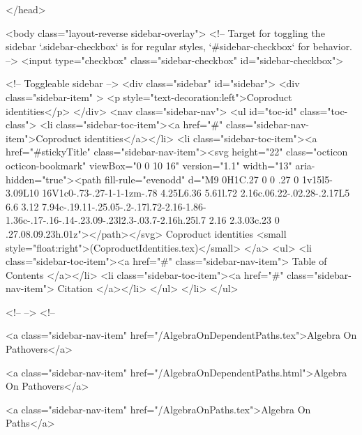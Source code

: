</head>


  <body class="layout-reverse sidebar-overlay">
    <!-- Target for toggling the sidebar `.sidebar-checkbox` is for regular
     styles, `#sidebar-checkbox` for behavior. -->
<input type="checkbox" class="sidebar-checkbox" id="sidebar-checkbox">

<!-- Toggleable sidebar -->
<div class="sidebar" id="sidebar">
  <div class="sidebar-item" >
    <p style="text-decoration:left">Coproduct identities</p>
  </div>
  <nav class="sidebar-nav">
    <ul id="toc-id" class="toc-class">
  <li class="sidebar-toc-item"><a href="#" class="sidebar-nav-item">Coproduct identities</a></li>
  <li class="sidebar-toc-item"><a href="#stickyTitle" class="sidebar-nav-item"><svg height="22" class="octicon octicon-bookmark" viewBox="0 0 10 16" version="1.1" width="13" aria-hidden="true"><path fill-rule="evenodd" d="M9 0H1C.27 0 0 .27 0 1v15l5-3.09L10 16V1c0-.73-.27-1-1-1zm-.78 4.25L6.36 5.61l.72 2.16c.06.22-.02.28-.2.17L5 6.6 3.12 7.94c-.19.11-.25.05-.2-.17l.72-2.16-1.86-1.36c-.17-.16-.14-.23.09-.23l2.3-.03.7-2.16h.25l.7 2.16 2.3.03c.23 0 .27.08.09.23h.01z"></path></svg> Coproduct identities <small style="float:right">(CoproductIdentities.tex)</small>
</a>
    <ul>
      <li class="sidebar-toc-item"><a href="#" class="sidebar-nav-item"> Table of Contents </a></li>
      <li class="sidebar-toc-item"><a href="#" class="sidebar-nav-item"> Citation </a></li>
    </ul>
  </li>
</ul>


    <!--  -->
    <!-- 
      
    
      
    
      
    
      
        
      
    
      
        
          <a class="sidebar-nav-item" href="/AlgebraOnDependentPaths.tex">Algebra On Pathovers</a>
        
      
    
      
        
          <a class="sidebar-nav-item" href="/AlgebraOnDependentPaths.html">Algebra On Pathovers</a>
        
      
    
      
        
          <a class="sidebar-nav-item" href="/AlgebraOnPaths.tex">Algebra On Paths</a>
        
      
    
      
        
